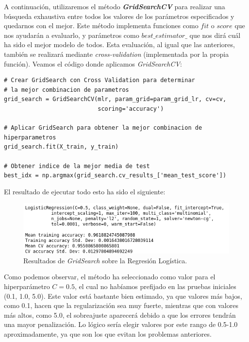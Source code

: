 \documentclass[11pt,a4paper]{article}
\begin{document}
A continuación, utilizaremos el método \textbf{\textit{GridSearchCV}}\cite{GridSearchCV} para realizar una búsqueda exhaustiva entre todos
los valores de los parámetros especificados y quedarnos con el mejor. Este método implementa funciones como $fit$ o $score$ que nos
ayudarán a evaluarlo, y parámetros como $best\_estimator\_$ que nos dirá cuál ha sido el mejor modelo de todos. Esta evaluación, al igual
que las anteriores, también se realizará mediante \textit{cross-validation} (implementada por la propia función). Veamos el código donde
aplicamos \textit{GridSearchCV}:

\begin{lstlisting}
# Crear GridSearch con Cross Validation para determinar
# la mejor combinacion de parametros
grid_search = GridSearchCV(mlr, param_grid=param_grid_lr, cv=cv,
                           scoring='accuracy')

# Aplicar GridSearch para obtener la mejor combinacion de hiperparametros
grid_search.fit(X_train, y_train)

# Obtener indice de la mejor media de test
best_idx = np.argmax(grid_search.cv_results_['mean_test_score'])

\end{lstlisting}

El resultado de ejecutar todo esto ha sido el siguiente:

\begin{figure}[H]
    \centering
    \includegraphics[scale=0.6]{img/gs-lr.png}
    \caption{Resultados de \textit{GridSearch} sobre la Regresión Logística.}
    \label{fig:gs-lr}
\end{figure}

Como podemos observar, el método ha seleccionado como valor para el hiperparámetro $C = 0.5$, el cual no habíamos prefijado en las pruebas
iniciales (0.1, 1.0, 5.0). Este valor está bastante bien estimado, ya que valores más bajos, como 0.1, hacen que la regularización sea muy
fuerte, mientras que con valores más altos, como 5.0, el sobreajuste aparecerá debido a que los errores tendrán una mayor penalización. Lo
lógico sería elegir valores por este rango de 0.5-1.0 aproximadamente, ya que son los que evitan los problemas anteriores.
\end{document}

